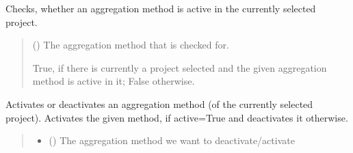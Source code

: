 \documentclass[letterpaper,10pt,english]{sphinxmanual}
\begin{document}
\begin{fulllineitems}
\begin{fulllineitems}
\label{\detokenize{apidoc/src.osm_configurator.control:src.osm_configurator.control.control.Control.is_aggregation_method_active}}
\pysigstartsignatures
{}
\pysigstopsignatures
\sphinxAtStartPar
Checks, whether an aggregation method is active in the currently selected project.
\begin{quote}\begin{description}
\sphinxAtStartPar
{} ({\hyperref[\detokenize{apidoc/src.osm_configurator.model.project.calculation:src.osm_configurator.model.project.calculation.aggregation_method_enum.AggregationMethod}]{}}) \textendash{} The aggregation method that is checked for.

\sphinxAtStartPar
True, if there is currently a project selected and the given aggregation method is active in it; False otherwise.

\sphinxAtStartPar
{}

\end{description}\end{quote}

\end{fulllineitems}


\begin{fulllineitems}
\label{\detokenize{apidoc/src.osm_configurator.control:src.osm_configurator.control.control.Control.set_aggregation_method_active}}
\pysigstartsignatures
{}
\pysigstopsignatures
\sphinxAtStartPar
Activates or deactivates an aggregation method (of the currently selected project).
Activates the given method, if active=True and deactivates it otherwise.
\begin{quote}\begin{description}
\begin{itemize}
\item {} 
\sphinxAtStartPar
{} ({\hyperref[\detokenize{apidoc/src.osm_configurator.model.project.calculation:src.osm_configurator.model.project.calculation.aggregation_method_enum.AggregationMethod}]{}}) \textendash{} The aggregation method we want to deactivate/activate


\end{itemize}
\end{description}
\end{quote}
\end{fulllineitems}
\end{fulllineitems}
\end{document}

